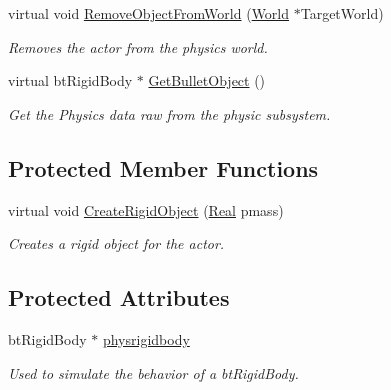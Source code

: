 \begin{DoxyCompactItemize}
virtual void \hyperlink{classphys_1_1ActorRigid_a7101df2a149e0ccb3678b7c2c00998f8}{RemoveObjectFromWorld} (\hyperlink{classphys_1_1World}{World} $\ast$TargetWorld)
\begin{DoxyCompactList}\small\item\em Removes the actor from the physics world. \item\end{DoxyCompactList}\item 
virtual btRigidBody $\ast$ \hyperlink{classphys_1_1ActorRigid_a9c8f1f4b99f41ab97050f5b15c802f14}{GetBulletObject} ()
\begin{DoxyCompactList}\small\item\em Get the Physics data raw from the physic subsystem. \item\end{DoxyCompactList}\end{DoxyCompactItemize}
\subsection*{Protected Member Functions}
\begin{DoxyCompactItemize}
\item 
virtual void \hyperlink{classphys_1_1ActorRigid_a19227c52b972cd96ad69a7b6273e2bbf}{CreateRigidObject} (\hyperlink{namespacephys_af7eb897198d265b8e868f45240230d5f}{Real} pmass)
\begin{DoxyCompactList}\small\item\em Creates a rigid object for the actor. \item\end{DoxyCompactList}\end{DoxyCompactItemize}
\subsection*{Protected Attributes}
\begin{DoxyCompactItemize}
\item 
\hypertarget{classphys_1_1ActorRigid_a690889f942e177644f4f8521f509c88d}{
btRigidBody $\ast$ \hyperlink{classphys_1_1ActorRigid_a690889f942e177644f4f8521f509c88d}{physrigidbody}}
\label{d8/d71/classphys_1_1ActorRigid_a690889f942e177644f4f8521f509c88d}

\begin{DoxyCompactList}\small\item\em Used to simulate the behavior of a btRigidBody. \item\end{DoxyCompactList}\end{DoxyCompactItemize}
